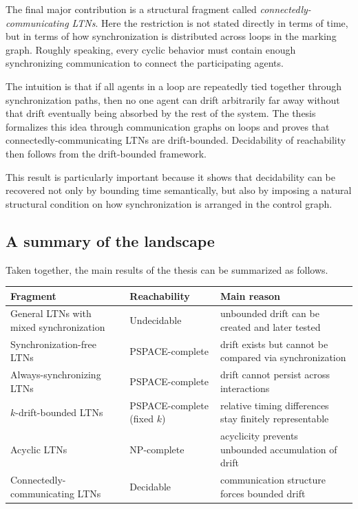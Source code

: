The final major contribution is a structural fragment called \emph{connectedly-communicating LTNs}. Here the restriction is not stated directly in terms of time, but in terms of how synchronization is distributed across loops in the marking graph. Roughly speaking, every cyclic behavior must contain enough synchronizing communication to connect the participating agents.

The intuition is that if all agents in a loop are repeatedly tied together through synchronization paths, then no one agent can drift arbitrarily far away without that drift eventually being absorbed by the rest of the system. The thesis formalizes this idea through communication graphs on loops and proves that connectedly-communicating LTNs are drift-bounded. Decidability of reachability then follows from the drift-bounded framework.

This result is particularly important because it shows that decidability can be recovered not only by bounding time semantically, but also by imposing a natural structural condition on how synchronization is arranged in the control graph.

\subsection{A summary of the landscape}

Taken together, the main results of the thesis can be summarized as follows.

\begin{center}
\begin{tabular}{p{5.0cm}p{3.2cm}p{4.0cm}}
\toprule
\textbf{Fragment} & \textbf{Reachability} & \textbf{Main reason} \\
\midrule
General LTNs with mixed synchronization & Undecidable & unbounded drift can be created and later tested \\
Synchronization-free LTNs & PSPACE-complete & drift exists but cannot be compared via synchronization \\
Always-synchronizing LTNs & PSPACE-complete & drift cannot persist across interactions \\
$k$-drift-bounded LTNs & PSPACE-complete (fixed $k$) & relative timing differences stay finitely representable \\
Acyclic LTNs & NP-complete & acyclicity prevents unbounded accumulation of drift \\
Connectedly-communicating LTNs & Decidable & communication structure forces bounded drift \\
\bottomrule
\end{tabular}
\end{center}

